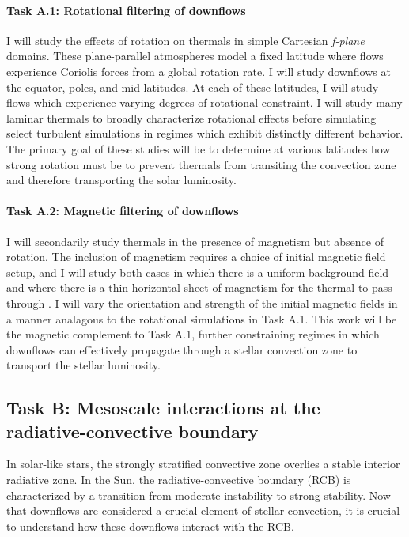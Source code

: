 \documentclass[11pt, preprint]{aastex}
\begin{document}
\vspace{-0.5cm}
\paragraph{Task A.1: Rotational filtering of downflows}
\label{sct:taskA1}
I will study the effects of rotation on thermals in simple Cartesian \emph{f-plane} domains.
These plane-parallel atmospheres model a fixed latitude where flows experience Coriolis forces from a global rotation rate.
I will study downflows at the equator, poles, and mid-latitudes.
At each of these latitudes, I will study flows which experience varying degrees of rotational constraint.
I will study many laminar thermals to broadly characterize rotational effects before simulating select turbulent simulations in regimes which exhibit distinctly different behavior.
The primary goal of these studies will be to determine at various latitudes how strong rotation must be to prevent thermals from transiting the convection zone and therefore transporting the solar luminosity.

\vspace{-0.7cm}
\paragraph{Task A.2: Magnetic filtering of downflows}
\label{sct:taskA2}
I will secondarily study thermals in the presence of magnetism but absence of rotation.
The inclusion of magnetism requires a choice of initial magnetic field setup, and I will study both cases in which there is a uniform background field and where there is a thin horizontal sheet of magnetism for the thermal to pass through \citep[as in][]{tobias&all1998}.
I will vary the orientation and strength of the initial magnetic fields in a manner analagous to the rotational simulations in Task A.1.
This work will be the magnetic complement to Task A.1, further constraining regimes in which downflows can effectively propagate through a stellar convection zone to transport the stellar luminosity.


\vspace{-0.8cm}
\subsection*{Task B: Mesoscale interactions at the radiative-convective boundary}
\vspace{-0.3cm}
\label{sct:taskB}
In solar-like stars, the strongly stratified convective zone overlies a stable interior radiative zone.
In the Sun, the radiative-convective boundary (RCB) is characterized by a transition from moderate instability to strong stability.
Now that downflows are considered a crucial element of stellar convection, it is crucial to understand how these downflows interact with the RCB.
\end{document}
